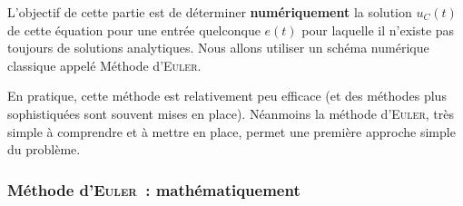\documentclass[../main/main.tex]{subfiles}
\begin{document}
{	L'objectif de cette partie est de déterminer \textbf{numériquement} la
	solution $u_{C}(t)$ de cette équation pour une entrée quelconque $e(t)$ pour
	laquelle il n'existe pas toujours de solutions analytiques. Nous allons
	utiliser un schéma numérique classique appelé Méthode d'\textsc{Euler}.

	En pratique, cette méthode est relativement peu efficace (et des méthodes plus
	sophistiquées sont souvent mises en place). Néanmoins la méthode
	d'\textsc{Euler}, très simple à comprendre et à mettre en place, permet une
	première approche simple du problème.

	\subsubsection{Méthode d'\textsc{Euler}~: mathématiquement}
	\label{sssec:euler}

}
\end{document}

